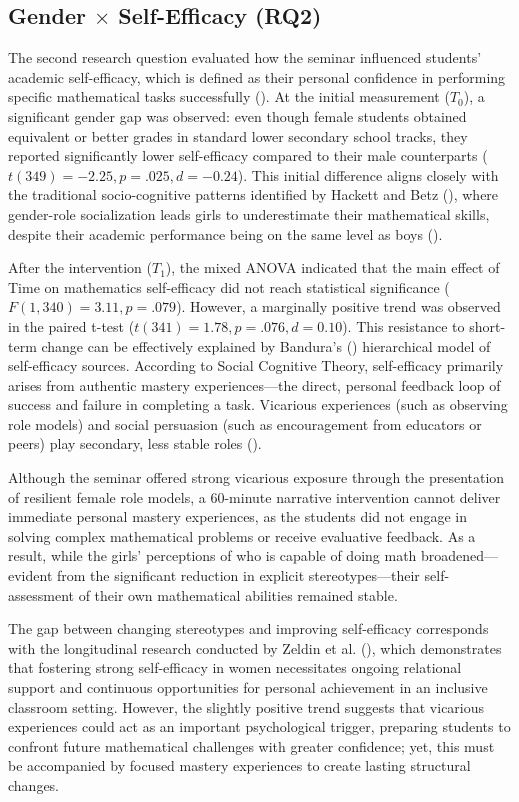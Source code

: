 \subsection{Gender $\times$ Self-Efficacy (RQ2)}
The second research question evaluated how the seminar influenced students' academic self-efficacy, which is defined as their personal confidence in performing specific mathematical tasks successfully (\cite{Zel,Bandura2001}). At the initial measurement ($T_0$), a significant gender gap was observed: even though female students obtained equivalent or better grades in standard lower secondary school tracks, they reported significantly lower self-efficacy compared to their male counterparts ($t(349) = -2.25, p = .025, d = -0.24$). This initial difference aligns closely with the traditional socio-cognitive patterns identified by Hackett and Betz (\citeyear{HACKETT1981326}), where gender-role socialization leads girls to underestimate their mathematical skills, despite their academic performance being on the same level as boys (\cite{Pajares2005}).

After the intervention ($T_1$), the mixed ANOVA indicated that the main effect of Time on mathematics self-efficacy did not reach statistical significance ($F(1, 340)= 3.11, p= .079$). However, a marginally positive trend was observed in the paired t-test ($t(341)=1.78, p= .076, d= 0.10$). This resistance to short-term change can be effectively explained by Bandura's (\citeyear{Bandura1997}) hierarchical model of self-efficacy sources. According to Social Cognitive Theory, self-efficacy primarily arises from authentic mastery experiences—the direct, personal feedback loop of success and failure in completing a task. Vicarious experiences (such as observing role models) and social persuasion (such as encouragement from educators or peers) play secondary, less stable roles (\cite{Usher2008}).

Although the seminar offered strong vicarious exposure through the presentation of resilient female role models, a 60-minute narrative intervention cannot deliver immediate personal mastery experiences, as the students did not engage in solving complex mathematical problems or receive evaluative feedback. As a result, while the girls' perceptions of who is capable of doing math broadened—evident from the significant reduction in explicit stereotypes—their self-assessment of their own mathematical abilities remained stable.

The gap between changing stereotypes and improving self-efficacy corresponds with the longitudinal research conducted by Zeldin et al. (\citeyear{Zel}), which demonstrates that fostering strong self-efficacy in women necessitates ongoing relational support and continuous opportunities for personal achievement in an inclusive classroom setting. However, the slightly positive trend suggests that vicarious experiences could act as an important psychological trigger, preparing students to confront future mathematical challenges with greater confidence; yet, this must be accompanied by focused mastery experiences to create lasting structural changes.

